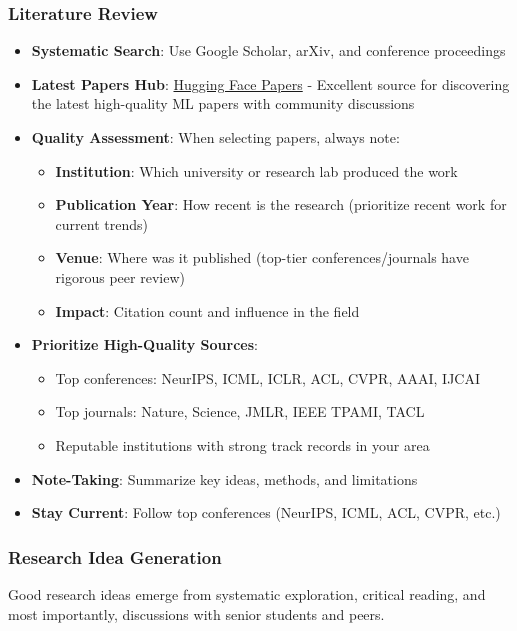\documentclass[11pt,a4paper]{article}
\begin{document}
\subsubsection{Literature Review}
\begin{itemize}
    \item \textbf{Systematic Search}: Use Google Scholar, arXiv, and conference proceedings
    \item \textbf{Latest Papers Hub}: \href{https://huggingface.co/papers}{Hugging Face Papers} - Excellent source for discovering the latest high-quality ML papers with community discussions
    \item \textbf{Quality Assessment}: When selecting papers, always note:
    \begin{itemize}
        \item \textbf{Institution}: Which university or research lab produced the work
        \item \textbf{Publication Year}: How recent is the research (prioritize recent work for current trends)
        \item \textbf{Venue}: Where was it published (top-tier conferences/journals have rigorous peer review)
        \item \textbf{Impact}: Citation count and influence in the field
    \end{itemize}
    \item \textbf{Prioritize High-Quality Sources}:
    \begin{itemize}
        \item Top conferences: NeurIPS, ICML, ICLR, ACL, CVPR, AAAI, IJCAI
        \item Top journals: Nature, Science, JMLR, IEEE TPAMI, TACL
        \item Reputable institutions with strong track records in your area
    \end{itemize}
    \item \textbf{Note-Taking}: Summarize key ideas, methods, and limitations
    \item \textbf{Stay Current}: Follow top conferences (NeurIPS, ICML, ACL, CVPR, etc.)
\end{itemize}

\subsubsection{Research Idea Generation}

\begin{tcolorbox}[colback=green!5,colframe=green!50,title=Ideas Come From Connections]
Good research ideas emerge from systematic exploration, critical reading, and most importantly, discussions with senior students and peers.
\end{tcolorbox}
\end{document}
